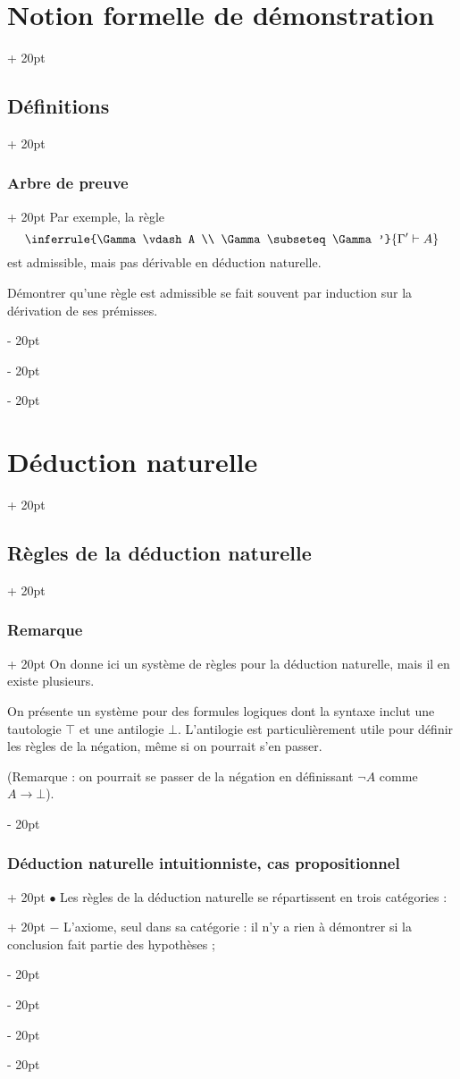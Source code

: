 \documentclass[a4paper, 12pt, twoside]{article}
\newcommand{\ind}[1][20pt]{\advance\leftskip + #1}
\newcommand{\deind}[1][20pt]{\advance\leftskip - #1}
\newenvironment{indt}[2][20pt]{#2 \par \ind[#1]}{\par \deind} %
\begin{document}
\begin{indt}{\section{Notion formelle de démonstration}}
\begin{indt}{\subsection{Définitions}}
\begin{indt}{\subsubsection{Arbre de preuve}}
                Par exemple, la règle
                \[
                    \inferrule{\Gamma \vdash A \\ \Gamma \subseteq \Gamma'}{\Gamma' \vdash A}
                \]
                est admissible, mais pas dérivable en déduction naturelle.

                Démontrer qu'une règle est admissible se fait souvent par induction sur la dérivation de ses prémisses.
            \end{indt}
        \end{indt}
    \end{indt}

    \vspace{12pt}
    
    \begin{indt}{\section{Déduction naturelle}}
        \begin{indt}{\subsection{Règles de la déduction naturelle}}
            \begin{indt}{\subsubsection{Remarque}}
                On donne ici un système de règles pour la déduction naturelle, mais il en existe plusieurs.

                On présente un système pour des formules logiques dont la syntaxe inclut une tautologie $\top$ et une antilogie $\bot$.
                L'antilogie est particulièrement utile pour définir les règles de la négation, même si on pourrait s'en passer.

                (Remarque : on pourrait se passer de la négation en définissant $\neg A$ comme $A \rightarrow \bot$).
            \end{indt}

            \vspace{12pt}
            
            \begin{indt}{\subsubsection{Déduction naturelle intuitionniste, cas propositionnel}}
                \begin{indt}{$\bullet$ Les règles de la déduction naturelle se répartissent en trois catégories :}
                    $-$ L'axiome, seul dans sa catégorie : il n'y a rien à démontrer si la conclusion fait partie des hypothèses ;


\end{indt}
\end{indt}
\end{indt}
\end{indt}
\end{document}
